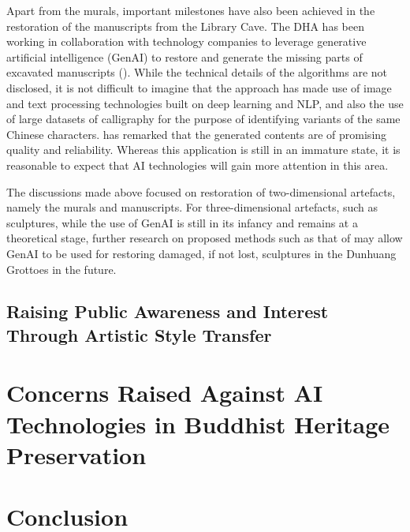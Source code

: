 Apart from the murals, important milestones have also been achieved in the restoration of the manuscripts from
the Library Cave. The DHA has been working in collaboration with technology companies to leverage generative
artificial intelligence (GenAI) to restore and generate the missing parts of excavated manuscripts
(). While the technical details of the algorithms are not
disclosed, it is not difficult to imagine that the approach has made use of image and text processing technologies
built on deep learning and NLP, and also the use of large datasets of calligraphy for the purpose of identifying
variants of the same Chinese characters.  has remarked that
the generated contents are of promising quality and reliability. Whereas this application is still in an immature
state, it is reasonable to expect that AI technologies will gain more attention in this area.

The discussions made above focused on restoration of two-dimensional artefacts, namely the murals and manuscripts.
For three-dimensional artefacts, such as sculptures, while the use of GenAI is still in its infancy and remains
at a theoretical stage, further research on proposed methods such as that of
 may allow GenAI to be used for restoring damaged, if not
lost, sculptures in the Dunhuang Grottoes in the future.

\subsection{Raising Public Awareness and Interest Through Artistic Style Transfer}

\section{Concerns Raised Against AI Technologies in Buddhist Heritage Preservation}

\section{Conclusion}

\printbibliography